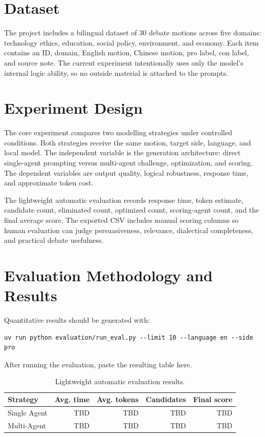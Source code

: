 \documentclass[11pt]{article}
\begin{document}
\section{Dataset}
The project includes a bilingual dataset of 30 debate motions across five domains: technology ethics, education, social policy, environment, and economy. Each item contains an ID, domain, English motion, Chinese motion, pro label, con label, and source note. The current experiment intentionally uses only the model's internal logic ability, so no outside material is attached to the prompts.

\section{Experiment Design}
The core experiment compares two modelling strategies under controlled conditions. Both strategies receive the same motion, target side, language, and local model. The independent variable is the generation architecture: direct single-agent prompting versus multi-agent challenge, optimization, and scoring. The dependent variables are output quality, logical robustness, response time, and approximate token cost.

The lightweight automatic evaluation records response time, token estimate, candidate count, eliminated count, optimized count, scoring-agent count, and the final average score. The exported CSV includes manual scoring columns so human evaluation can judge persuasiveness, relevance, dialectical completeness, and practical debate usefulness.

\section{Evaluation Methodology and Results}
Quantitative results should be generated with:

\begin{verbatim}
uv run python evaluation/run_eval.py --limit 10 --language en --side pro
\end{verbatim}

After running the evaluation, paste the resulting table here.

\begin{table}[h]
\centering
\begin{tabular}{lrrrr}
\toprule
Strategy & Avg. time & Avg. tokens & Candidates & Final score \\
\midrule
Single Agent & TBD & TBD & TBD & TBD \\
Multi-Agent & TBD & TBD & TBD & TBD \\
\bottomrule
\end{tabular}
\caption{Lightweight automatic evaluation results.}
\end{table}
\end{document}
